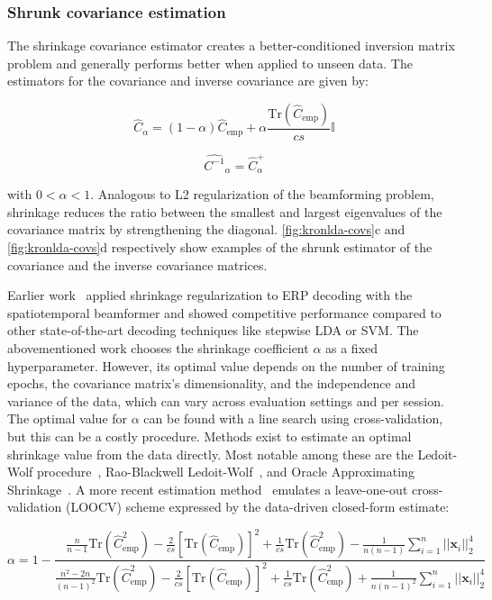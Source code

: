 	\subsubsection{Shrunk covariance estimation}
	\label{sec:shrunk_covariance}
	The shrinkage covariance estimator creates a better-conditioned inversion matrix problem and generally performs better when applied to unseen data.
	The estimators for the covariance and inverse covariance are given by:

	\begin{equation}
		\hat{C}_\alpha =
		(1-\alpha) \hat{C}_\text{emp}
		+ \alpha\frac{\text{Tr}(\hat{C}_\text{emp})}{cs}\mathbb{I}
		\label{eq:shrinkage}
	\end{equation}


	\begin{equation}
		\widehat{C^{-1}}_\alpha =
		\hat{C}^+_\alpha
		\label{eq:shrinkage_inverse}
	\end{equation}

	with $0<\alpha<1$.
	Analogous to L2 regularization of the beamforming problem,
	shrinkage reduces the ratio between the smallest and largest eigenvalues
	of the covariance matrix by strengthening the diagonal.
	\autoref{fig:kronlda-covs}c and \autoref{fig:kronlda-covs}d respectively show examples of the
	shrunk estimator of the covariance and the inverse covariance matrices.

	Earlier work~\cite{Libert2021} applied shrinkage regularization to ERP
	decoding with the spatiotemporal beamformer and showed competitive performance
	compared to other state-of-the-art decoding techniques like stepwise LDA or SVM.
	The abovementioned work chooses the shrinkage coefficient $\alpha$ as a fixed hyperparameter.
	However, its optimal value depends on the number of training epochs, the
	covariance matrix's dimensionality, and the independence and variance of the
	data, which can vary across evaluation settings and per session.
	The optimal value for $\alpha$ can be found with a line search using cross-validation, but this can be a costly procedure.
	Methods exist to estimate an optimal shrinkage value from the data directly.
	Most notable among these are the Ledoit-Wolf procedure~\cite{Ledoit2004},
	Rao-Blackwell Ledoit-Wolf~\cite{Chen2010shrinkage}, and Oracle Approximating Shrinkage~\cite{Chen2010shrinkage}.
	A more recent estimation method~\cite{Tong2018} emulates a leave-one-out
	cross-validation (LOOCV) scheme expressed by the data-driven closed-form
	estimate:

	\begin{equation}
		\alpha =
		1-\frac{
			\frac{n}{n-1}\text{Tr}(\hat{C}_\text{emp}^2)
			- \frac{2}{cs}\left[\text{Tr}(\hat{C}_\text{emp})\right]^2
			+ \frac{1}{cs}\text{Tr}(\hat{C}_\text{emp}^2)
			- \frac{1}{n(n-1)}\sum_{i=1}^n||\mathbf{x}_i||_2^4
		}
		{
			\frac{n^2 -2n}{(n-1)^2}\text{Tr}(\hat{C}_\text{emp}^2)
			- \frac{2}{cs}\left[\text{Tr}(\hat{C}_\text{emp})\right]^2
			+ \frac{1}{cs}\text{Tr}(\hat{C}_\text{emp}^2)
			+ \frac{1}{n(n-1)^2}\sum_{i=1}^n||\mathbf{x}_i||_2^4
		}
		\label{eq:loocv}
	\end{equation}

